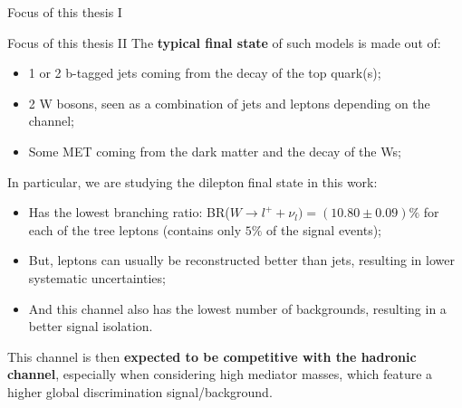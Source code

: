 \documentclass[8pt]{beamer}
\begin{document}
\begin{frame}{Focus of this thesis I}
\end{frame}

\begin{frame}{Focus of this thesis II}
\justifying
The \textbf{typical final state} of such models is made out of:
\begin{itemize}
\justifying
\item 1 or 2 b-tagged jets coming from the decay of the top quark(s);
\item 2 W bosons, seen as a combination of jets and leptons depending on the channel;
\item Some MET coming from the dark matter and the decay of the Ws;
\end{itemize} \vfill

In particular, we are studying the \alert{dilepton final state} in this work: 
\begin{itemize}
\justifying
\item Has the lowest branching ratio: BR($W \rightarrow l^+ + \nu_l) = (10.80 \pm 0.09)\%$ for each of the tree leptons (contains only $5\%$ of the signal events);
\item But, leptons can usually be reconstructed better than jets, resulting in lower systematic uncertainties;
\item And this channel also has the lowest number of backgrounds, resulting in a better signal isolation.
\end{itemize} \vfill

This channel is then \textbf{expected to be competitive with the hadronic channel}, especially when considering high mediator masses, which feature a higher global discrimination signal/background. \vfill
\end{frame}
\end{document}

